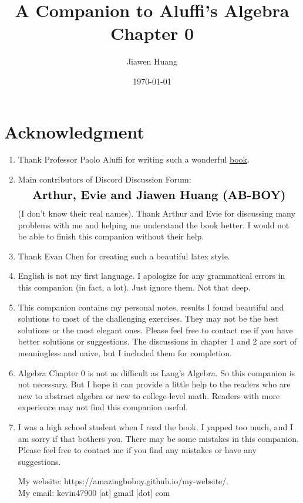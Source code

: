 \documentclass[15pt]{scrartcl}
\begin{document}
\title{A Companion to Aluffi's Algebra Chapter 0}
\date{\today}
\author{Jiawen Huang}

\maketitle

\section{Acknowledgment}
\begin{enumerate}
    \item Thank Professor Paolo Aluffi for writing such a wonderful \href{https://bookstore.ams.org/gsm-104}{book}. 
    \item Main contributors of Discord Discussion Forum: \[\Large{\textbf{Arthur, Evie and Jiawen Huang (AB-BOY)}}\] (I don't know their real names). Thank Arthur and Evie for discussing many problems with me and helping me understand the book better. I would not be able to finish this companion without their help. 
    \item Thank Evan Chen for creating such a beautiful latex style. 
    \item English is not my first language. I apologize for any grammatical errors in this companion (in fact, a lot). Just ignore them. Not that deep. 
    \item This companion contains my personal notes, results I found beautiful and solutions to most of the challenging exercises. They may not be the best solutions or the most elegant ones. Please feel free to contact me if you have better solutions or suggestions. The discussions in chapter 1 and 2 are sort of meaningless and naive, but I included them for completion. 
    \item Algebra Chapter 0 is not as difficult as Lang's Algebra. So this companion is not necessary. But I hope it can provide a little help to the readers who are new to abstract algebra or new to college-level math. Readers with more experience may not find this companion useful.
    \item I was a high school student when I read the book. I yapped too much, and I am sorry if that bothers you. There may be some mistakes in this companion. Please feel free to contact me if you find any mistakes or have any suggestions. 
    \begin{center}
        My website: https://amazingboboy.github.io/my-website/.
        \\
        My email: kevin47900 [at] gmail [dot] com
        
    \end{center}
\end{enumerate}
\end{document}
